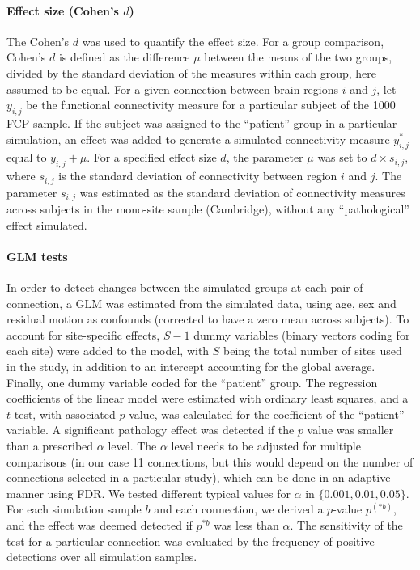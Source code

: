 \documentclass[authoryear]{elsarticle}
\begin{document}
\paragraph{Effect size (Cohen's $d$)}
The Cohen's $d$ was used to quantify the effect size. For a group comparison, Cohen's $d$ is defined as the difference $\mu$ between the means of the two groups, divided by the standard deviation of the measures within each group, here assumed to be equal. For a given connection between brain regions $i$ and $j$, let $y_{i,j}$ be the functional connectivity measure for a particular subject of the 1000 FCP sample. If the subject was assigned to the ``patient'' group in a particular simulation, an effect was added to generate a simulated connectivity measure $y_{i,j}^*$ equal to $y_{i,j} + \mu$. For a specified effect size $d$, the parameter $\mu$ was set to $d\times s_{i,j}$, where $s_{i,j}$ is the standard deviation of connectivity between region $i$ and $j$. The parameter $s_{i,j}$ was estimated as the standard deviation of connectivity measures across subjects in the mono-site sample (Cambridge), without any ``pathological'' effect simulated.

\paragraph{GLM tests}
In order to detect changes between the simulated groups at each pair of connection, a GLM was estimated from the simulated data, using age, sex and residual motion as confounds (corrected to have a zero mean across subjects). To account for site-specific effects, $S-1$ dummy variables (binary vectors coding for each site) were added to the model, with $S$ being the total number of sites used in the study, in addition to an intercept accounting for the global average. Finally, one dummy variable coded for the ``patient'' group. The regression coefficients of the linear model were estimated with ordinary least squares, and a $t$-test, with associated $p$-value, was calculated for the coefficient of the ``patient'' variable. A significant pathology effect was detected if the $p$ value was smaller than a prescribed $\alpha$ level. The $\alpha$ level needs to be adjusted for multiple comparisons (in our case 11 connections, but this would depend on the number of connections selected in a particular study), which can be done in an adaptive manner using FDR. We tested different typical values for $\alpha$ in $\{0.001,0.01,0.05\}$. For each simulation sample $b$ and each connection, we derived a $p$-value $p^{(*b)}$, and the effect was deemed detected if $p^{*b}$ was less than $\alpha$. The sensitivity of the test for a particular connection was evaluated by the frequency of positive detections over all simulation samples.
\end{document}

